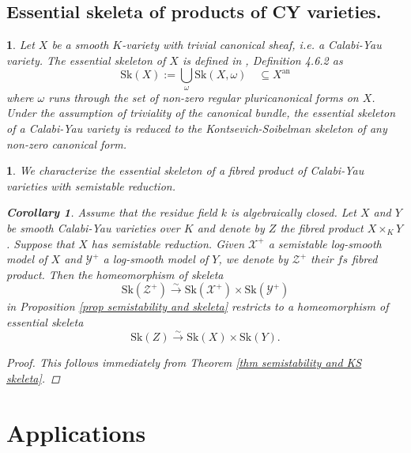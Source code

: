 \documentclass{amsart}%
\numberwithin{equation}{subsection}
\theoremstyle{plain2}
\newtheorem{cor}[equation]{Corollary}
\theoremstyle{definition2}
\theoremstyle{stepstyle}
\theoremstyle{point}
\theoremstyle{subpoint}
\newtheorem{subpoint}[equation]{}%
\newcommand{\spa}[1]{\begin{subpoint}#1\end{subpoint}}           %
\newcommand{\cX}{\ensuremath{\mathscr{X}}}
\newcommand{\cY}{\ensuremath{\mathscr{Y}}}
\newcommand{\cZ}{\ensuremath{\mathscr{Z}}}
\renewcommand{\cZ}{\ensuremath{\mathscr{Z}}}
\renewcommand{\cY}{\ensuremath{\mathscr{Y}}}
\newcommand{\Sk}{\mathrm{Sk}}
\begin{document}
\subsection{Essential skeleta of products of CY varieties.}

\spa{Let $X$ be a smooth $K$-variety with trivial canonical sheaf, i.e. a Calabi-Yau variety. The essential skeleton of $X$ is defined in \cite{MustataNicaise}, Definition 4.6.2 as $$\Sk(X):=\bigcup_{\omega} \Sk(X, \omega) \quad \subseteq X^{\text{an}}$$ where $\omega$ runs through the set of non-zero regular pluricanonical forms on $X$. Under the assumption of triviality of the canonical bundle, the essential skeleton of a Calabi-Yau variety is reduced to the Kontsevich-Soibelman skeleton of any non-zero canonical form.}

\spa{We characterize the essential skeleton of a fibred product of Calabi-Yau varieties with semistable reduction.
\begin{cor}  \label{cor semistability and essential skeleta}
Assume that the residue field $k$ is algebraically closed. Let $X$ and $Y$ be smooth Calabi-Yau varieties over $K$ and denote by $Z$ the fibred product $X\times_K Y$. Suppose that $X$ has semistable reduction. Given $\cX^+$ a semistable log-smooth model of $X$ and $\cY^+$ a log-smooth model of $Y$, we denote by $\cZ^+$ their $fs$ fibred product. Then the homeomorphism of skeleta $$\Sk(\cZ^+) \xrightarrow{\sim} \Sk(\cX^+) \times \Sk(\cY^+)$$ in Proposition \ref{prop semistability and skeleta} restricts to a homeomorphism of essential skeleta $$\Sk(Z) \xrightarrow{\sim} \Sk(X) \times \Sk(Y).$$ 
\end{cor}
\begin{proof}
This follows immediately from Theorem \ref{thm semistability and KS skeleta}.
\end{proof}
}

\section{Applications}
\end{document}

